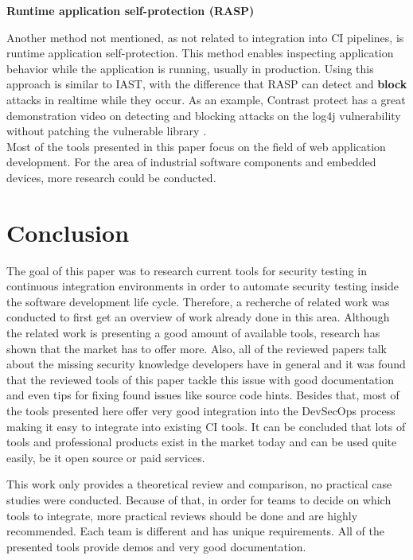 \documentclass[conference]{IEEEtran}
\begin{document}
\textbf{Runtime application self-protection (RASP)}

Another method not mentioned, as not related to integration into CI pipelines, is runtime application self-protection. This method enables inspecting application behavior while the application is running, usually in production. Using this approach is similar to IAST, with the difference that RASP can detect and \textbf{block} attacks in realtime while they occur. As an example, Contrast protect has a great demonstration video on detecting and blocking attacks on the log4j vulnerability without patching the vulnerable library \cite{iast12}.\\

Most of the tools presented in this paper focus on the field of web application development. For the area of industrial software components and embedded devices, more research could be conducted.



\section{Conclusion}

The goal of this paper was to research current tools for security testing in continuous integration environments in order to automate security testing inside the software development life cycle. Therefore, a recherche of related work was conducted to first get an overview of work already done in this area. Although the related work is presenting a good amount of available tools, research has shown that the market has to offer more. Also, all of the reviewed papers talk about the missing security knowledge developers have in general and it was found that the reviewed tools of this paper tackle this issue with good documentation and even tips for fixing found issues like source code hints. Besides that, most of the tools presented here offer very good integration into the DevSecOps process making it easy to integrate into existing CI tools. It can be concluded that lots of tools and professional products exist in the market today and can be used quite easily, be it open source or paid services.

This work only provides a theoretical review and comparison, no practical case studies were conducted. Because of that, in order for teams to decide on which tools to integrate, more practical reviews should be done and are highly recommended. Each team is different and has unique requirements. All of the presented tools provide demos and very good documentation.
\end{document}
